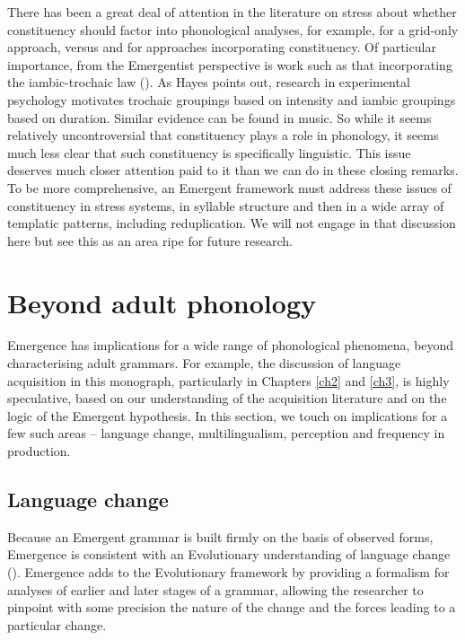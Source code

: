  There has been a great deal of attention in the literature on stress about whether constituency should factor into phonological analyses, for example, \citet{Prince:1983} for a grid-only approach, versus \citet{Halle+:1987} and \citet{Hayes:1995} for approaches incorporating constituency. Of particular importance, from the Emergentist perspective is work such as that incorporating the iambic-trochaic law (\citealt{Hayes:1985, Yiu:2018}). As Hayes points out, research in experimental psychology motivates trochaic groupings based on intensity and iambic groupings based on duration. Similar evidence can be found in music. So while it seems relatively uncontroversial that constituency plays a role in phonology, it seems much less clear that such constituency is specifically linguistic. This issue deserves much closer attention paid to it than we can do in these closing remarks. To be more comprehensive, an Emergent framework must address these issues of constituency in stress systems, in syllable structure and then in a wide array of templatic patterns, including reduplication. We will not engage in that discussion here but see this as an area ripe for future research. 

\section{Beyond adult phonology}

Emergence has implications for a wide range of phonological phenomena, beyond characterising adult grammars. For example,  the discussion of language acquisition in this monograph, particularly in Chapters \ref{ch2} and \ref{ch3}, is highly speculative, based on our understanding of the acquisition literature and on the logic of the Emergent hypothesis. In this section, we touch on implications for a few such areas -- language change, multilingualism, perception and frequency in production.  

\subsection{Language change}

Because an Emergent grammar is built firmly on the basis of observed forms, Emergence is consistent with an Evolutionary understanding of language change (\citealt{Blevins:2004, Wedel:2006}).  Emergence adds to the Evolutionary framework by providing a formalism for analyses of earlier and later stages of a grammar, allowing the researcher to pinpoint with some precision the nature of the change and the forces leading to a particular change. 

